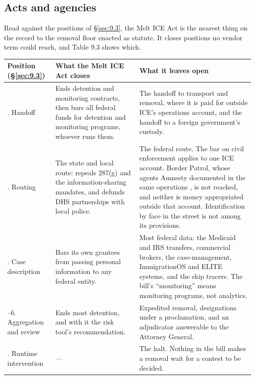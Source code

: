 \subsection{Acts and agencies}
\label{sec:9.4.2}
Read against the positions of \S\ref{sec:9.3}, the Melt ICE Act is the nearest thing on the record to the removal floor enacted as statute. It closes positions no vendor term could reach, and Table 9.3 shows which.


\begingroup\small\renewcommand{\arraystretch}{1.12}
\begin{longtable}{@{}>{\raggedright\arraybackslash}p{}>{\raggedright\arraybackslash}p{}>{\raggedright\arraybackslash}p{}@{}}
\hline
\textbf{Position (\S\ref{sec:9.3})} & \textbf{What the Melt ICE Act closes} & \textbf{What it leaves open} \\
\hline
\endhead
8. Handoff & Ends detention and monitoring contracts, then bars all federal funds for detention and monitoring programs, whoever runs them. & The handoff to transport and removal, where it is paid for outside ICE's operations account, and the handoff to a foreign government's custody. \\ \hline
2. Routing & The state and local route: repeals 287(g) and the information-sharing mandates, and defunds DHS partnerships with local police. & The federal route. The bar on civil enforcement applies to one ICE account. Border Patrol, whose agents Amnesty documented in the same operations \autocite{Amnesty2026Whistles}, is not reached, and neither is money appropriated outside that account. Identification by face in the street is not among its provisions. \\ \hline
3. Case description & Bars its own grantees from passing personal information to any federal entity. & Most federal data: the Medicaid and IRS transfers, commercial brokers, the case-management, ImmigrationOS and ELITE systems, and the skip tracers. The bill's “monitoring” means monitoring programs, not analytics. \\ \hline
5–6. Aggregation and review & Ends most detention, and with it the risk tool's recommendation. & Expedited removal, designations under a proclamation, and an adjudicator answerable to the Attorney General. \\ \hline
9. Runtime intervention & — & The halt. Nothing in the bill makes a removal wait for a contest to be decided. \\ \hline
\end{longtable}
\endgroup

